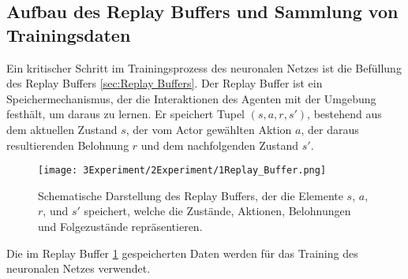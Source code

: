 \subsection{Aufbau des Replay Buffers und Sammlung von Trainingsdaten}

Ein kritischer Schritt im Trainingsprozess des neuronalen Netzes ist die Befüllung des Replay Buffers \ref{sec:Replay Buffers}. Der Replay Buffer ist ein Speichermechanismus, der die Interaktionen des Agenten mit der Umgebung festhält, um daraus zu lernen. Er speichert Tupel \( (s, a, r, s') \), bestehend aus dem aktuellen Zustand \( s \), der vom Actor gewählten Aktion \( a \), der daraus resultierenden Belohnung \( r \) und dem nachfolgenden Zustand \( s' \).

\begin{figure}[htbp]
\centering
\texttt{[image: 3Experiment/2Experiment/1Replay\_Buffer.png]}
\caption{Schematische Darstellung des Replay Buffers, der die Elemente \( s \), \( a \), \( r \), und \( s' \) speichert, welche die Zustände, Aktionen, Belohnungen und Folgezustände repräsentieren.}
\label{fig:replay-buffer}
\end{figure}

Die im Replay Buffer \ref{fig:replay-buffer} gespeicherten Daten werden für das Training des neuronalen Netzes verwendet.


